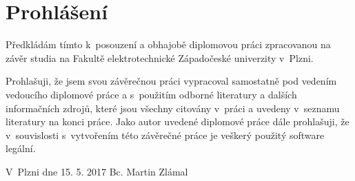 \chapter*{Prohlášení}
Předkládám tímto k~posouzení a obhajobě diplomovou práci zpracovanou na závěr studia na Fakultě elektrotechnické Západočeské univerzity v~Plzni.

Prohlašuji, že jsem svou závěrečnou práci vypracoval samostatně pod vedením vedoucího diplomové práce a s~použitím odborné literatury a dalších informačních zdrojů, které jsou všechny citovány v~práci a uvedeny v~seznamu literatury na konci práce. Jako autor uvedené diplomové práce dále prohlašuji, že v~souvislosti s~vytvořením této závěrečné práce je veškerý použitý software legální.

\hfill \namesig

\vfill
V~Plzni dne 15. 5. 2017
\hfill Bc. Martin Zlámal
